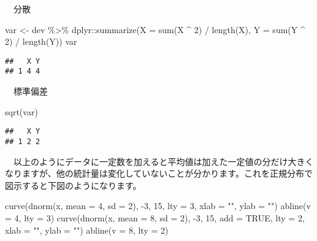 \documentclass[
  12pt,
]{book}
\newenvironment{Shaded}{\begin{snugshade}}{\end{snugshade}}
\newcommand{\AttributeTok}[1]{\textcolor[rgb]{0.77,0.63,0.00}{#1}}
\newcommand{\ConstantTok}[1]{\textcolor[rgb]{0.00,0.00,0.00}{#1}}
\newcommand{\DecValTok}[1]{\textcolor[rgb]{0.00,0.00,0.81}{#1}}
\newcommand{\FunctionTok}[1]{\textcolor[rgb]{0.00,0.00,0.00}{#1}}
\newcommand{\NormalTok}[1]{#1}
\newcommand{\OtherTok}[1]{\textcolor[rgb]{0.56,0.35,0.01}{#1}}
\newcommand{\SpecialCharTok}[1]{\textcolor[rgb]{0.00,0.00,0.00}{#1}}
\newcommand{\StringTok}[1]{\textcolor[rgb]{0.31,0.60,0.02}{#1}}
\begin{document}
　分散

\begin{Shaded}
\begin{Highlighting}[]
\NormalTok{var }\OtherTok{\textless{}{-}}\NormalTok{ dev }\SpecialCharTok{\%\textgreater{}\%} 
\NormalTok{  dplyr}\SpecialCharTok{::}\FunctionTok{summarize}\NormalTok{(}\AttributeTok{X =} \FunctionTok{sum}\NormalTok{(X }\SpecialCharTok{\^{}} \DecValTok{2}\NormalTok{) }\SpecialCharTok{/} \FunctionTok{length}\NormalTok{(X), }\AttributeTok{Y =} \FunctionTok{sum}\NormalTok{(Y }\SpecialCharTok{\^{}} \DecValTok{2}\NormalTok{) }\SpecialCharTok{/} \FunctionTok{length}\NormalTok{(Y))}
\NormalTok{var}
\end{Highlighting}
\end{Shaded}

\begin{verbatim}
##   X Y
## 1 4 4
\end{verbatim}

　標準偏差

\begin{Shaded}
\begin{Highlighting}[]
\FunctionTok{sqrt}\NormalTok{(var)}
\end{Highlighting}
\end{Shaded}

\begin{verbatim}
##   X Y
## 1 2 2
\end{verbatim}

　以上のようにデータに一定数を加えると平均値は加えた一定値の分だけ大きくなりますが、他の統計量は変化していないことが分かります。これを正規分布で図示すると下図のようになります。

\begin{Shaded}
\begin{Highlighting}[]
\FunctionTok{curve}\NormalTok{(}\FunctionTok{dnorm}\NormalTok{(x, }\AttributeTok{mean =} \DecValTok{4}\NormalTok{, }\AttributeTok{sd =} \DecValTok{2}\NormalTok{), }\SpecialCharTok{{-}}\DecValTok{3}\NormalTok{, }\DecValTok{15}\NormalTok{, }\AttributeTok{lty =} \DecValTok{3}\NormalTok{,}
      \AttributeTok{xlab =} \StringTok{""}\NormalTok{, }\AttributeTok{ylab =} \StringTok{""}\NormalTok{)}
\FunctionTok{abline}\NormalTok{(}\AttributeTok{v =} \DecValTok{4}\NormalTok{, }\AttributeTok{lty =} \DecValTok{3}\NormalTok{)}
\FunctionTok{curve}\NormalTok{(}\FunctionTok{dnorm}\NormalTok{(x, }\AttributeTok{mean =} \DecValTok{8}\NormalTok{, }\AttributeTok{sd =} \DecValTok{2}\NormalTok{), }\SpecialCharTok{{-}}\DecValTok{3}\NormalTok{, }\DecValTok{15}\NormalTok{, }\AttributeTok{add =} \ConstantTok{TRUE}\NormalTok{, }\AttributeTok{lty =} \DecValTok{2}\NormalTok{,}
      \AttributeTok{xlab =} \StringTok{""}\NormalTok{, }\AttributeTok{ylab =} \StringTok{""}\NormalTok{)}
\FunctionTok{abline}\NormalTok{(}\AttributeTok{v =} \DecValTok{8}\NormalTok{, }\AttributeTok{lty =} \DecValTok{2}\NormalTok{)}
\end{Highlighting}
\end{Shaded}
\end{document}
